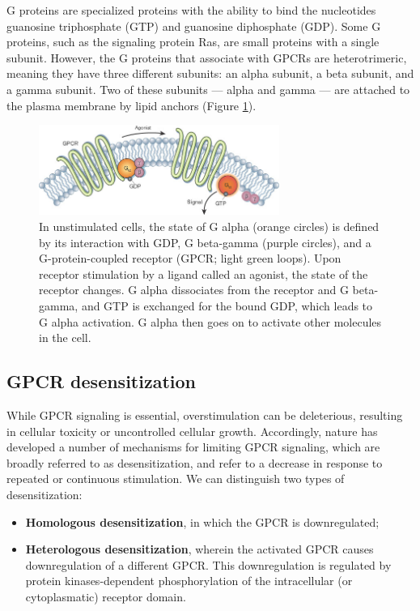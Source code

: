 \documentclass{book}
\begin{document}
G proteins are specialized proteins with the ability to bind the nucleotides guanosine triphosphate (GTP) and guanosine diphosphate (GDP). 
Some G proteins, such as the signaling protein Ras, are small proteins with a single subunit. However, the G proteins that associate with GPCRs are heterotrimeric, meaning they have three different subunits: an alpha subunit, a beta subunit, and a gamma subunit. Two of these subunits — alpha and gamma — are attached to the plasma membrane by lipid anchors (Figure \ref{fig:GPCR}).

\begin{figure}
   \centering
   \includegraphics[width=0.7\textwidth]{images3/image2.png}
   \caption{\label{fig:GPCR} In unstimulated cells, the state of G alpha (orange circles) is defined by its interaction with GDP, G beta-gamma (purple circles), and a G-protein-coupled receptor (GPCR; light green loops). Upon receptor stimulation by a ligand called an agonist, the state of the receptor changes. G alpha dissociates from the receptor and G beta-gamma, and GTP is exchanged for the bound GDP, which leads to G alpha activation. G alpha then goes on to activate other molecules in the cell.}
\end{figure}

\subsection{GPCR desensitization}
While GPCR signaling is essential, overstimulation can be deleterious, resulting in cellular toxicity or uncontrolled cellular growth. 
Accordingly, nature has developed a number of mechanisms for limiting GPCR signaling, which are broadly referred to as desensitization, and refer to a decrease in response to repeated or continuous stimulation. 
We can distinguish two types of desensitization:

\begin{itemize}
    \item \textbf{Homologous desensitization}, in which the GPCR is downregulated;
    \item \textbf{Heterologous desensitization}, wherein the activated GPCR causes downregulation of a different GPCR. This downregulation is regulated by protein kinases-dependent phosphorylation of the intracellular (or cytoplasmatic) receptor domain.
\end{itemize}
\end{document}
